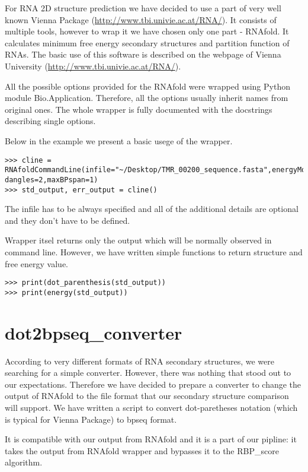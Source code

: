 For RNA 2D structure prediction we have decided to use a part of very well known
Vienna Package (\url{http://www.tbi.univie.ac.at/RNA/}). It consists of multiple
tools, however to wrap it we have chosen only one part - RNAfold. It calculates minimum
free energy secondary structures and partition function of RNAs. The basic use of
this software is described on the webpage of Vienna University
(\url{http://www.tbi.univie.ac.at/RNA/}).

All the possible options provided for the RNAfold were wrapped using Python module
Bio.Application. Therefore, all the options usually inherit names from original ones.
The whole wrapper is fully documented with the docstrings describing single options.

Below in the example we present a basic usege of the wrapper.

\begin{verbatim}
>>> cline = RNAfoldCommandLine(infile="~/Desktop/TMR_00200_sequence.fasta",energyModel=0, dangles=2,maxBPspan=1)
>>> std_output, err_output = cline()
\end{verbatim}

The infile has to be always specified and all of the additional details are optional
and they don't have to be defined.

Wrapper itsel returns only the output which will be normally observed in command line.
However, we have written simple functions to return structure and free energy value.

\begin{verbatim}
>>> print(dot_parenthesis(std_output))
>>> print(energy(std_output))
\end{verbatim}

\section{dot2bpseq_converter}

According to very different formats of RNA secondary structures, we were searching for
a simple converter. However, there was nothing that stood out to our expectations.
Therefore we have decided to prepare a converter to change the output of RNAfold to
the file format that our secondary structure comparison will support. We have written
a script to convert dot-paretheses notation (which is typical for Vienna Package) to
bpseq format.

It is compatible with our output from RNAfold and it is a part of our pipline:
it takes the output from RNAfold wrapper and bypasses it to the RBP_score algorithm.

